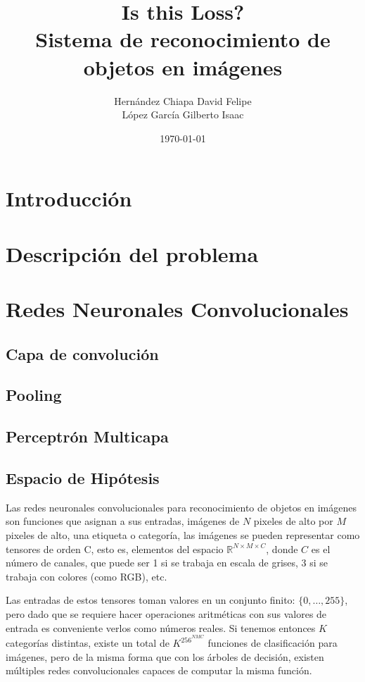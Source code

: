 \documentclass[spanish,11pt,letterpaper]{article}
\title{{\Huge Is this Loss?}\\
Sistema de reconocimiento de objetos en imágenes}
\author{Hernández Chiapa David Felipe\\
López García Gilberto Isaac}
\affil{Facultad de Ciencias\\Universidad Nacional Autónoma de México}
\date{\small\today}
\begin{document}
\maketitle

\section{Introducción}

\section{Descripción del problema}

\section{Redes Neuronales Convolucionales}



\subsection{Capa de convolución}



\subsection{Pooling}



\subsection{Perceptrón Multicapa}



\subsection{Espacio de Hipótesis}

Las redes neuronales convolucionales para reconocimiento de objetos en imágenes
son funciones que asignan a sus entradas, imágenes de $N$ pixeles de alto por $M$
pixeles de alto, una etiqueta o categoría, las imágenes se pueden representar
como tensores de orden C, esto es, elementos del espacio
$\mathbb{R}^{N\times M\times C}$, donde $C$ es el número de canales, que puede ser
1 si se trabaja en escala de grises, 3 si se trabaja con colores (como RGB), etc.

Las entradas de estos tensores toman valores en un conjunto finito: $\{0,\ldots,255\}$,
pero dado que se requiere hacer operaciones aritméticas con sus valores de entrada
es conveniente verlos como números reales. Si tenemos entonces $K$ categorías
distintas, existe un total de $K^{256^{NMC}}$ funciones de clasificación para
imágenes, pero de la misma forma que con los árboles de decisión, existen múltiples
redes convolucionales capaces de computar la misma función.
\end{document}
